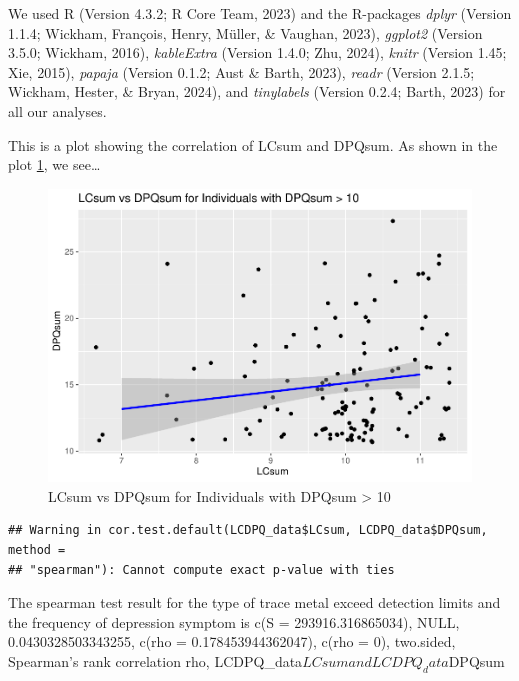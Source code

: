 \documentclass[
  man]{apa6}
\begin{document}
We used R (Version 4.3.2; R Core Team, 2023) and the R-packages \emph{dplyr} (Version 1.1.4; Wickham, François, Henry, Müller, \& Vaughan, 2023), \emph{ggplot2} (Version 3.5.0; Wickham, 2016), \emph{kableExtra} (Version 1.4.0; Zhu, 2024), \emph{knitr} (Version 1.45; Xie, 2015), \emph{papaja} (Version 0.1.2; Aust \& Barth, 2023), \emph{readr} (Version 2.1.5; Wickham, Hester, \& Bryan, 2024), and \emph{tinylabels} (Version 0.2.4; Barth, 2023) for all our analyses.

This is a plot showing the correlation of LCsum and DPQsum. As shown in the plot \ref{fig:LCDPQ-plot}, we see\ldots{}

\begin{figure}
\centering
\includegraphics{nhanes2017_files/figure-latex/LCDPQ-plot-1.pdf}
\caption{\label{fig:LCDPQ-plot}LCsum vs DPQsum for Individuals with DPQsum \textgreater{} 10}
\end{figure}

\begin{verbatim}
## Warning in cor.test.default(LCDPQ_data$LCsum, LCDPQ_data$DPQsum, method =
## "spearman"): Cannot compute exact p-value with ties
\end{verbatim}

The spearman test result for the type of trace metal exceed detection limits and the frequency of depression symptom is c(S = 293916.316865034), NULL, 0.0430328503343255, c(rho = 0.178453944362047), c(rho = 0), two.sided, Spearman's rank correlation rho, LCDPQ\_data\(LCsum and LCDPQ_data\)DPQsum
\end{document}
